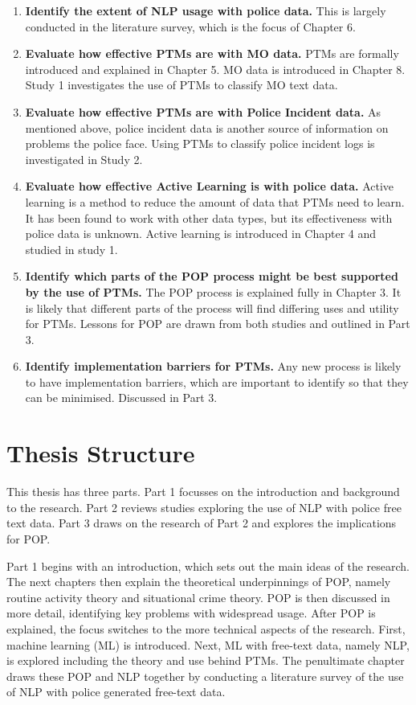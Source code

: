 \begin{enumerate}
\item {\bf Identify the extent of NLP usage with police data.} This is largely conducted in the literature survey, which is the focus of Chapter 6.

\item {\bf Evaluate how effective PTMs are with MO data.} PTMs are formally introduced and explained in Chapter 5. MO data is introduced in Chapter 8. Study 1 investigates the use of PTMs to classify MO text data.

\item {\bf Evaluate how effective PTMs are with Police Incident data.} As mentioned above, police incident data is another source of information on problems the police face. Using PTMs to classify police incident logs is investigated in Study 2.

\item {\bf Evaluate how effective Active Learning is with police data.}  Active learning is a method to reduce the amount of data that PTMs need to learn. It has been found to work with other data types, but its effectiveness with police data is unknown. Active learning is introduced in Chapter 4 and studied in study 1.

\item {\bf Identify which parts of the POP process might be best supported by the use of PTMs.} The POP process is explained fully in Chapter 3. It is likely that different parts of the process will find differing uses and utility for PTMs. Lessons for POP are drawn from both studies and outlined in Part 3.

\item {\bf Identify implementation barriers for PTMs.} Any new process is likely to have implementation barriers, which are important to identify so that they can be minimised. Discussed in Part 3.
\end{enumerate}



\section{Thesis Structure} This thesis has three parts. Part 1 focusses on the introduction and background to the research. Part 2 reviews studies exploring the use of NLP with police free text data. Part 3 draws on the research of Part 2 and explores the implications for POP.

Part 1 begins with an introduction, which sets out the main ideas of the research. The next chapters then explain the theoretical underpinnings of POP, namely routine activity theory and situational crime theory. POP is then discussed in more detail, identifying key problems with widespread usage. After POP is explained, the focus switches to the more technical aspects of the research. First, machine learning (ML) is introduced. Next, ML with free-text data, namely NLP, is explored including the theory and use behind PTMs. The penultimate chapter draws these POP and NLP together by conducting a literature survey of the use of NLP with police generated free-text data.

